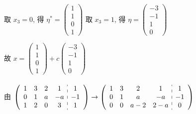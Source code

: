 \begin{enumerate}
                   取 \( x_{3} = 0 \), 得 \( \eta^{*} = \begin{pmatrix}
                       1 \\
                       1 \\
                       0 \\
                       1
                   \end{pmatrix} \) 取 \( x_{3} = 1 \), 得 \( \eta = \begin{pmatrix}
                       -3 \\
                       -1 \\
                       1  \\
                       0
                   \end{pmatrix} \)

                   故 \( x = \begin{pmatrix}
                       1 \\
                       1 \\
                       0 \\
                       1
                   \end{pmatrix} + c\begin{pmatrix}
                       -3 \\
                       -1 \\
                       1  \\
                       0
                   \end{pmatrix} \)
         \end{enumerate}


     \paragraph{} %
         由 \( \left(\begin{array}{cccc:c}
                 1 & 3 & 2 & 1  & 1  \\
                 0 & 1 & a & -a & -1 \\
                 1 & 2 & 0 & 3  & 1
             \end{array}\right) \rightarrow \left(\begin{array}{cccc:c}
                 1 & 3 & 2   & 1   & 1  \\
                 0 & 1 & a   & -a  & -1 \\
                 0 & 0 & a-2 & 2-a & 0
             \end{array}\right) \)

